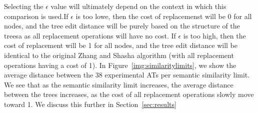 Selecting the $\epsilon$ value will ultimately depend on the context in which this comparison is used.If $\epsilon$ is too lowe, then the cost of replacemenst will be 0 for all nodes, and the tree edit distance will be purely based on the structure of the treesa as all replacement operations will have no cost. If $\epsilon$ is too high, then the cost of replacement will be 1 for all nodes, and the tree edit distance will be identical to the original Zhang and Shasha algorithm (with all replacement operations having a cost of 1). In Figure~\ref{img:similaritylimits}, we show the average distance between the 38 experimental ATs per semantic similarity limit. We see that as the semantic similarity limit increases, the average distance between the trees increases, as the cost of all replacement operations slowly move toward 1. We discuss this further in Section~\ref{sec:results}